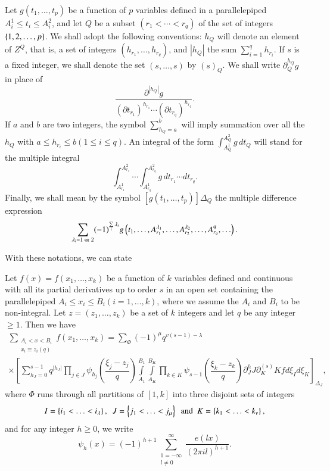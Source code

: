 Let $g(t_1,\ldots,t_p)$ be a function of $p$ variables defined in a 
parallelepiped $A_i^1\leq t_i\leq A_i^2$, and let $Q$ be a subset 
$(r_1<\cdots <r_q)$ of the set of integers $\left\{{1,2,\ldots,p}\right\}$. We 
shall adopt the following conventions: $h_Q$ will denote an element of 
$Z^Q$, that is, a set of integers $(h_{r_1},\ldots,h_{r_q})$, and 
$|h_Q|$ the sum $\sum\limits_{i=1}^qh_{r_i}$. If $s$ is a fixed 
integer, we shall denote the set $(s,\ldots,s)$ by $(s)_Q$. We shall 
write $\partial_Q^{h_Q}g$ in place of 
$$
\frac{\partial^{|h_Q|}g}{(\partial t_{r_1})^{h_{r_1}}\cdots (\partial 
t_{r_q})^{h_{r_q}}}.
$$
If $a$ and $b$ are two integers, the symbol $\sum\limits_{h_Q=a}^b$ 
will imply summation over all the $h_Q$ with $a\leq h_{r_i}\leq b 
(1\leq i\leq q)$. An integral of the form 
$\int_{A_Q^1}^{A_Q^2}g\,dt_Q$ will stand for the multiple integral 
$$
\int_{A_{r_1}^1}^{A_{r_1}^2}\cdots \int_{A_{r_q}^1}^{A_{r_q}^2}g\, 
dt_{r_1}\cdots dt_{r_q}.
$$
Finally, we shall mean by the symbol $[g(t_1,\ldots,t_p)]\Delta_Q$ the 
multiple difference expression
$$
\sum\limits_{\lambda_i=1\;\text{or}\;2}(-1)^{\sum\limits_i\lambda_i}g 
\left({t_1,\ldots,A_{r_1}^{\lambda_1},\ldots,A_{r_2}^{\lambda_2}, 
\ldots,A_{r_q}^{q},\ldots}\right).
$$

With these notations, we can state 

\begin{lemma}\label{lem3.2}
Let $f(x)=f(x_1,\ldots,x_k)$ be a function of $k$ variables defined 
and continuous with all its partial derivatives up to order $s$ in an 
open set containing the parallelepiped $A_i\leq x_i\leq 
B_i(i=1,\ldots, k)$, where we assume the $A_i$ and $B_i$ to be 
non-integral. Let $z=(z_1,\ldots,z_k)$ be a set of $k$ integers and 
let $q$ be any integer $\geq 1$. Then we have 	
{\fontsize{09pt}{11pt}\selectfont
\begin{multline*}
\sum\limits_{\substack{A_i < x < B_i\\x_i \equiv z_i (q)}}  f(x_1, \ldots, x_k) = \sum\limits_\Phi (-1)^{\mu} q^{v(s-1)-\lambda}\\
\times \left[\sum\limits^{s-1}_{h_J=0} q^{|h_J|} \prod\limits_{j \in J} \psi_{h_j}  \left(\dfrac{\xi_j        -z_j}{q} \right) \int\limits^{B_1}_{A_1} \int\limits^{B_K}_{A_K} \prod\limits_{k \in K} \psi_{s-1} \left(\dfrac{\xi_k - z_k}{q} \right) \partial^h_J J \partial^{(s)}_K K f d \xi_I d \xi_K \right]_{\Delta_J},
\end{multline*}}\relax
where $\Phi$ runs through all partitions of $[1,k]$ into three disjoint sets of integers
$$
I = \left\{{i_1 < \ldots < i_\lambda}\right\}, \ \ J = \left\{{j_1 < \ldots < j_\mu}\right\}~ \text{ and } ~K = \left\{{k_1 < \ldots < k_v}\right\},
$$
and for any integer $h \geq 0$, we write 
$$
\psi_h (x) = (-1)^{h+1} \sum\limits^{\infty}_{\substack{1=-\infty\\l\ne 0}} \dfrac{e(lx)}{(2\pi il)^{h +1}}.
$$
\end{lemma}

